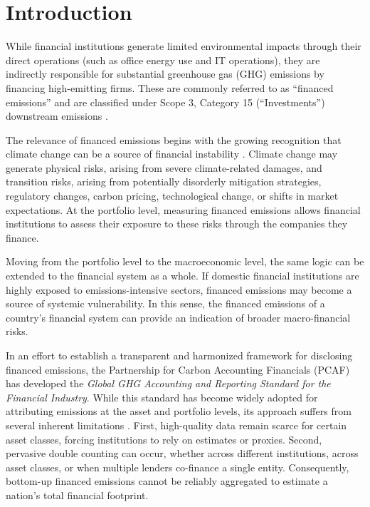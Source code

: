
\chapter{Introduction} %

\label{Chapter1} %


While financial institutions generate limited environmental impacts through their direct operations (such as office energy use and IT operations), they are indirectly responsible for substantial greenhouse gas (GHG) emissions by financing high-emitting firms. These are commonly referred to as “financed emissions” and are classified under Scope 3, Category 15 (“Investments”) downstream emissions \citep{ghg_protocol_corporate_2011}.

The relevance of financed emissions begins with the growing recognition that climate change can be a source of financial instability \citep{bolton_green_2020, esrb_esrb_2021}. Climate change may generate physical risks, arising from severe climate-related damages, and transition risks, arising from potentially disorderly mitigation strategies, regulatory changes, carbon pricing, technological change, or shifts in market expectations. At the portfolio level, measuring financed emissions allows financial institutions to assess their exposure to these risks through the companies they finance.

Moving from the portfolio level to the macroeconomic level, the same logic can be extended to the financial system as a whole. If domestic financial institutions are highly exposed to emissions-intensive sectors, financed emissions may become a source of systemic vulnerability. In this sense, the financed emissions of a country’s financial system can provide an indication of broader macro-financial risks. 

In an effort to establish a transparent and harmonized framework for disclosing financed emissions, the Partnership for Carbon Accounting Financials (PCAF) has developed the \textit{Global GHG Accounting and Reporting Standard for the Financial Industry}. While this standard has become widely adopted for attributing emissions at the asset and portfolio levels, its approach suffers from several inherent limitations \citep{pcaf_global_2022}. First, high-quality data remain scarce for certain asset classes, forcing institutions to rely on estimates or proxies. Second, pervasive double counting can occur, whether across different institutions, across asset classes, or when multiple lenders co-finance a single entity. Consequently, bottom-up financed emissions cannot be reliably aggregated to estimate a nation's total financial footprint. 

